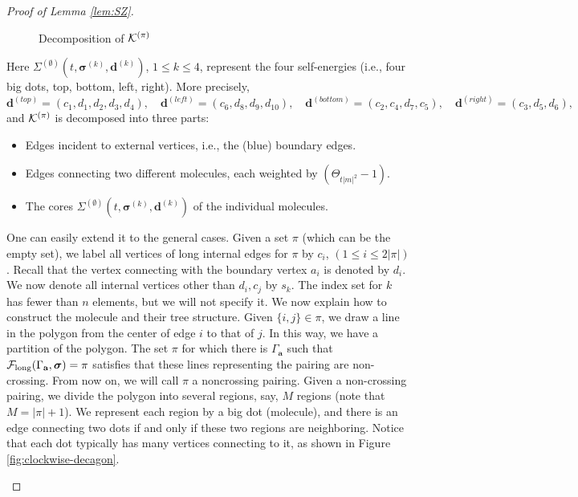 \documentclass[10pt,reqno]{article}
\theoremstyle{plain} %
\theoremstyle{remark}
\numberwithin{equation}{section}
\begin{document}
\begin{proof}[ Proof of Lemma  \ref{lem:SZ}]
\begin{figure}[ht]
    \caption{Decomposition of $\cal K^{(\pi)}$}
    \label{fig:Decp}
\end{figure}
Here  ${\Sigma}^{(\emptyset)}(t, \boldsymbol{\sigma}^{(k)}, \textbf{d}^{(k)})$, $1\le k\le 4$, 
represent the four self-energies   (i.e., four big dots, top, bottom, left, right). More precisely,  
$$
\textbf{d}^{(top)}=(c_1,d_1,d_2,d_3,d_4),\quad
\textbf{d}^{(left)}=(c_6,d_8,d_9,d_{10}),\quad
\textbf{d}^{(bottom)}=(c_2,c_4,d_7,c_5),\quad
\textbf{d}^{(right)}=(c_3,d_5,d_6),\quad
$$
and   $\cal K^{(\pi)}$ is decomposed  into three parts: 
\begin{itemize}
    \item Edges incident to external vertices, i.e., the (blue) boundary edges.
    \item Edges connecting two different molecules, each weighted by $\left(\Theta_{{t|m|^2}}-1\right)$.
    \item The cores ${\Sigma}^{(\emptyset)}(t, \boldsymbol{\sigma}^{(k)}, \textbf{d}^{(k)})$ of the individual molecules.
\end{itemize}






One can easily extend it to the general cases. Given a set 
$\pi$ (which can be the empty set), we label all vertices of long internal edges for $\pi$ by $c_i$, $(1\le i\le 2|\pi|)$. Recall that the vertex connecting with the 
boundary vertex $a_i$ is denoted by  $d_i$. We now denote all internal vertices other than $d_i, c_j$ by $s_k$. 
The index set for $k$ has fewer than $n$ elements, but we will not specify it.
We now explain how to construct the molecule and their tree structure. Given $ \{i, j \} \in \pi$, we draw a line in the polygon from the center of edge $i$ to 
that of $j$.  In this way, we have a partition of the polygon. The set $\pi$ for which there is $\Gamma_{\textbf{a}}$ such that $ {\cal F}_{\mathrm{long}}(\Gamma_{\textbf{a}}, \boldsymbol{\sigma})=\pi $ satisfies that these lines representing the pairing are non-crossing. From now on, we will call $\pi$ a noncrossing pairing. 
Given a non-crossing pairing, we divide the polygon into several regions, say, $M$ regions (note that $M=|\pi|+1$). We represent each region by a big dot (molecule), and there is an edge connecting two dots if and only if these two regions are neighboring.    Notice that each dot typically has many vertices connecting to it, as shown in Figure \ref{fig:clockwise-decagon}. 
\usetikzlibrary{calc}
\begin{figure}[ht]
    \centering 
  \begin{tikzpicture}[scale=0.8]


\end{tikzpicture}
\end{figure}
\end{proof}
\end{document}
